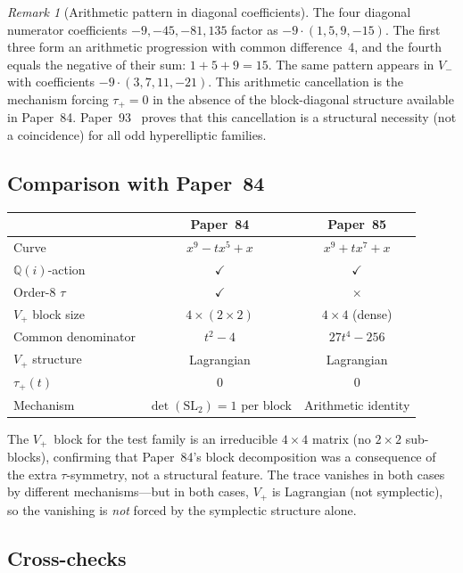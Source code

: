 \documentclass[11pt]{article}
\theoremstyle{plain}
\theoremstyle{definition}
\theoremstyle{remark}
\newtheorem{remark}[theorem]{Remark}
\newcommand{\Q}{\mathbb{Q}}
\newcommand{\SL}{\mathrm{SL}}
\begin{document}
\begin{remark}[Arithmetic pattern in diagonal coefficients]\label{rem:pattern}
The four diagonal numerator coefficients $-9, -45, -81, 135$ factor as
$-9 \cdot (1, 5, 9, -15)$.  The first three form an arithmetic
progression with common difference~4, and the fourth equals the
negative of their sum: $1 + 5 + 9 = 15$.  The same pattern appears
in $V_-$ with coefficients $-9 \cdot (3, 7, 11, -21)$.  This
arithmetic cancellation is the mechanism forcing $\tau_+ = 0$ in the
absence of the block-diagonal structure available in Paper~84.
Paper~93~\cite{Lee2026p93} proves that this cancellation is a
structural necessity (not a coincidence) for all odd hyperelliptic
families.
\end{remark}

\subsection{Comparison with Paper~84}

\begin{center}
\begin{tabular}{lcc}
\toprule
& \textbf{Paper~84} & \textbf{Paper~85} \\
\midrule
Curve & $x^9 - tx^5 + x$ & $x^9 + tx^7 + x$ \\
$\Q(i)$-action & $\checkmark$ & $\checkmark$ \\
Order-8 $\tau$ & $\checkmark$ & $\times$ \\
$V_+$ block size & $4 \times (2 \times 2)$ & $4 \times 4$ (dense) \\
Common denominator & $t^2 - 4$ & $27t^4 - 256$ \\
$V_+$ structure & Lagrangian & Lagrangian \\
$\tau_+(t)$ & $0$ & $0$ \\
Mechanism & $\det(\SL_2) = 1$ per block & Arithmetic identity \\
\bottomrule
\end{tabular}
\end{center}

The $V_+$~block for the test family is an irreducible $4 \times 4$
matrix (no $2 \times 2$ sub-blocks), confirming that Paper~84's
block decomposition was a consequence of the extra
$\tau$-symmetry, not a structural feature.  The trace
vanishes in both cases by different mechanisms---but in both cases,
$V_+$ is Lagrangian (not symplectic), so the vanishing is
\emph{not} forced by the symplectic structure alone.

\subsection{Cross-checks}
\end{document}
